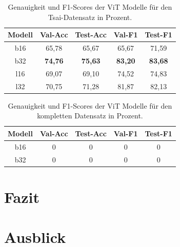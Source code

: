 \documentclass[twoside,a4paper]{IEEEtran}
\begin{document}
\begin{table}[!htb]
	\caption{Genauigkeit und F1-Scores der ViT Modelle für den Tsai-Datensatz in Prozent.}
	\label{vit_ergebnis_tsai}
	\centering
	\begin{tabular}{|c|c|c|c|c|}
		\hline
		Modell & Val-Acc & Test-Acc & Val-F1 & Test-F1\\
		\hline
		\hline
		b16 & 65,78 & 65,67 & 65,67 & 71,59\\
		\hline
		b32 & \textbf{74,76} & \textbf{75,63} & \textbf{83,20} & \textbf{83,68}\\
		\hline
		l16 & 69,07 & 69,10 & 74,52 & 74,83\\
		\hline
		l32 & 70,75 & 71,28 & 81,87 & 82,13\\
		\hline 
	\end{tabular}
\end{table}
\begin{table}[!htb]
	\caption{Genauigkeit und F1-Scores der ViT Modelle für den kompletten Datensatz in Prozent.}
	\label{vit_ergebnis_full}
	\centering
	\begin{tabular}{|c|c|c|c|c|}
		\hline
		Modell & Val-Acc & Test-Acc & Val-F1 & Test-F1\\
		\hline
		\hline 
		b16 & 0 & 0 & 0 & 0\\
		\hline
		b32 & 0 & 0 & 0 & 0\\
		\hline 
	\end{tabular}
\end{table}
\section{Fazit} %
\section{Ausblick}




%
%
\end{document}
